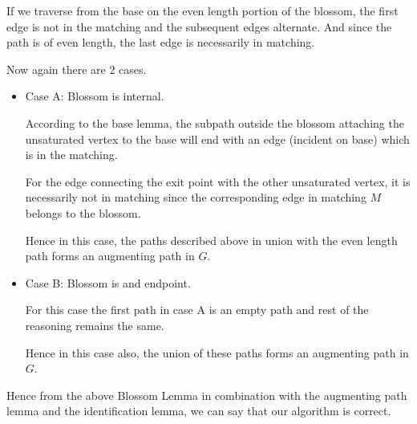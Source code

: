 If we traverse from the base on the even length portion of the blossom, the first edge is not in the matching and the subsequent edges alternate. And since the path is of even length, the last edge is necessarily in matching.

Now again there are 2 cases.
\begin{itemize}
    \item Case A: Blossom is internal.
        
        According to the base lemma, the subpath outside the blossom attaching the unsaturated vertex to the base will end with an edge (incident on base) which is in the matching.
        
        For the edge connecting the exit point with the other unsaturated vertex, it is necessarily not in matching since the corresponding edge in matching $M$ belongs to the blossom.
        
        Hence in this case, the paths described above in union with the even length path forms an augmenting path in $G$.
    \item Case B: Blossom is and endpoint.
    
        For this case the first path in case A is an empty path and rest of the reasoning remains the same.
        
        Hence in this case also, the union of these paths forms an augmenting path in $G$.
\end{itemize}
Hence from the above Blossom Lemma in combination with the augmenting path lemma and the identification lemma, we can say that our algorithm is correct.

